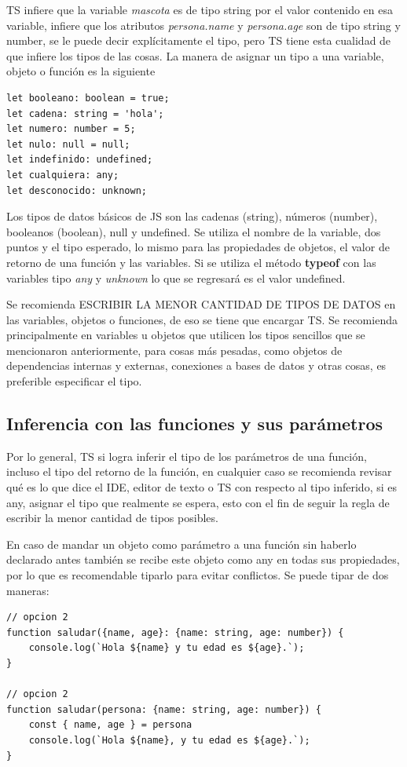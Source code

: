 TS infiere que la variable \textit{mascota} es de tipo string por el valor contenido en esa variable, infiere que los atributos \textit{persona.name} y \textit{persona.age} son de tipo string y number, se le puede decir explícitamente el tipo, pero TS tiene esta cualidad de que infiere los tipos de las cosas. La manera de asignar un tipo a una variable, objeto o función es la siguiente 
\begin{lstlisting}
let booleano: boolean = true;
let cadena: string = 'hola';
let numero: number = 5;
let nulo: null = null;
let indefinido: undefined;
let cualquiera: any;
let desconocido: unknown;
\end{lstlisting}

Los tipos de datos básicos de JS son las cadenas (string), números (number), booleanos (boolean), null y undefined. Se utiliza el nombre de la variable, dos puntos y el tipo esperado, lo mismo para las propiedades de objetos, el valor de retorno de una función y las variables. Si se utiliza el método \textbf{typeof} con las variables tipo \textit{any} y \textit{unknown} lo que se regresará es el valor undefined.

Se recomienda ESCRIBIR LA MENOR CANTIDAD DE TIPOS DE DATOS en las variables, objetos o funciones, de eso se tiene que encargar TS. Se recomienda principalmente en variables u objetos que utilicen los tipos sencillos que se mencionaron anteriormente, para cosas más pesadas, como objetos de dependencias internas y externas, conexiones a bases de datos y otras cosas, es preferible especificar el tipo.


\subsection{Inferencia con las funciones y sus parámetros}

Por lo general, TS si logra inferir el tipo de los parámetros de una función, incluso el tipo del retorno de la función, en cualquier caso se recomienda revisar qué es lo que dice el IDE, editor de texto o TS con respecto al tipo inferido, si es any, asignar el tipo que realmente se espera, esto con el fin de seguir la regla de escribir la menor cantidad de tipos posibles.

En caso de mandar un objeto como parámetro a una función sin haberlo declarado antes también se recibe este objeto como any en todas sus propiedades, por lo que es recomendable tiparlo para evitar conflictos. Se puede tipar de dos maneras:
\begin{lstlisting}
// opcion 2
function saludar({name, age}: {name: string, age: number}) {
    console.log(`Hola ${name} y tu edad es ${age}.`);
}

// opcion 2
function saludar(persona: {name: string, age: number}) {
    const { name, age } = persona
    console.log(`Hola ${name}, y tu edad es ${age}.`);
}
\end{lstlisting}

